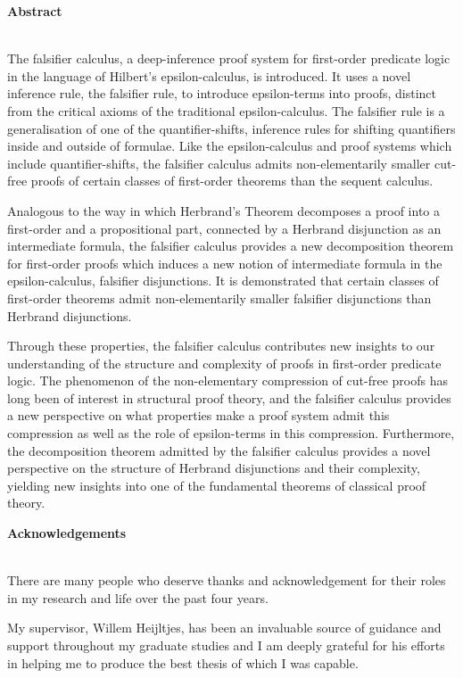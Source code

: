 \documentclass[10pt]{article}
\theoremstyle{definition}\newtheorem{remark}[theorem]{Remark}
\theoremstyle{definition}\newtheorem{example}[theorem]{Example}
\theoremstyle{definition}\newtheorem{definition}[theorem]{Definition}
\begin{document}
	\pagebreak
	
	\noindent
	\textbf{Abstract}
	
	\noindent
	\\ The falsifier calculus, a deep-inference proof system
	for first-order predicate logic in the language of Hilbert’s epsilon-calculus, is introduced. It uses a novel inference rule, the falsifier rule, to introduce epsilon-terms into proofs, distinct from the critical axioms of the traditional epsilon-calculus. The falsifier rule is a generalisation of	one of the quantifier-shifts, inference rules for shifting quantifiers inside and outside of formulae. Like the epsilon-calculus and proof systems which include quantifier-shifts, the falsifier calculus admits non-elementarily smaller cut-free proofs of certain classes of first-order theorems than the sequent calculus.
	
	Analogous to the way in which Herbrand’s Theorem decomposes a proof into a first-order and a propositional part, connected by a Herbrand disjunction as an intermediate formula, the falsifier calculus provides a new decomposition theorem for first-order proofs which induces a new notion of intermediate formula in the epsilon-calculus, falsifier disjunctions. It is demonstrated that certain classes of first-order theorems admit non-elementarily smaller falsifier disjunctions than Herbrand disjunctions.
	
	Through these properties, the falsifier calculus contributes new insights to our understanding of the structure and complexity of proofs in first-order predicate logic. The phenomenon of the non-elementary compression of cut-free proofs has long been of interest in structural proof theory, and the falsifier calculus provides a new perspective on what properties make a proof system admit this compression as well as the role of epsilon-terms in this compression. Furthermore, the decomposition theorem admitted by the falsifier calculus provides a novel perspective on the structure of Herbrand disjunctions and their complexity, yielding new insights into one of the fundamental theorems of classical proof theory.
	
	\pagebreak
	
	\noindent
	\textbf{Acknowledgements}
	
	\noindent
	\\ There are many people who deserve thanks and acknowledgement for their roles in my research and life over the past four years.
	
	My supervisor, Willem Heijltjes, has been an invaluable source of guidance and support throughout my graduate studies and I am deeply grateful for his efforts in helping me to produce the best thesis of which I was capable.
	
\end{document}
